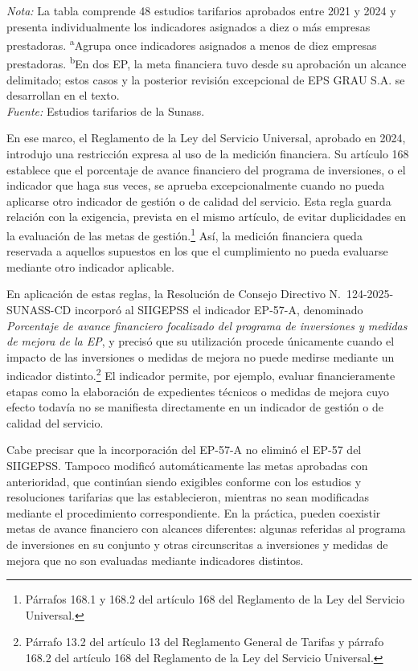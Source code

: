 \begin{table}[!t]
\vspace{0.15cm}
\begin{minipage}{\columnwidth}
\scriptsize
\textit{Nota:} La tabla comprende 48 estudios tarifarios aprobados entre 2021 y 2024 y presenta individualmente los indicadores asignados a diez o más empresas prestadoras. \textsuperscript{a}Agrupa once indicadores asignados a menos de diez empresas prestadoras. \textsuperscript{b}En dos EP, la meta financiera tuvo desde su aprobación un alcance delimitado; estos casos y la posterior revisión excepcional de EPS GRAU S.A. se desarrollan en el texto.\\
\textit{Fuente:} Estudios tarifarios de la Sunass.\\
\end{minipage}
\end{table}

En ese marco, el Reglamento de la Ley del Servicio Universal, aprobado en 2024, introdujo una restricción expresa al uso de la medición financiera. Su artículo 168 establece que el porcentaje de avance financiero del programa de inversiones, o el indicador que haga sus veces, se aprueba excepcionalmente cuando no pueda aplicarse otro indicador de gestión o de calidad del servicio. Esta regla guarda relación con la exigencia, prevista en el mismo artículo, de evitar duplicidades en la evaluación de las metas de gestión.\footnote{Párrafos 168.1 y 168.2 del artículo 168 del Reglamento de la Ley del Servicio Universal.} Así, la medición financiera queda reservada a aquellos supuestos en los que el cumplimiento no pueda evaluarse mediante otro indicador aplicable.

En aplicación de estas reglas, la Resolución de Consejo Directivo N.\textdegree~124-2025-SUNASS-CD incorporó al SIIGEPSS el indicador EP-57-A, denominado \textit{Porcentaje de avance financiero focalizado del programa de inversiones y medidas de mejora de la EP}, y precisó que su utilización procede únicamente cuando el impacto de las inversiones o medidas de mejora no puede medirse mediante un indicador distinto.\footnote{Párrafo 13.2 del artículo 13 del Reglamento General de Tarifas y párrafo 168.2 del artículo 168 del Reglamento de la Ley del Servicio Universal.} El indicador permite, por ejemplo, evaluar financieramente etapas como la elaboración de expedientes técnicos o medidas de mejora cuyo efecto todavía no se manifiesta directamente en un indicador de gestión o de calidad del servicio.

Cabe precisar que la incorporación del EP-57-A no eliminó el EP-57 del SIIGEPSS. Tampoco modificó automáticamente las metas aprobadas con anterioridad, que continúan siendo exigibles conforme con los estudios y resoluciones tarifarias que las establecieron, mientras no sean modificadas mediante el procedimiento correspondiente. En la práctica, pueden coexistir metas de avance financiero con alcances diferentes: algunas referidas al programa de inversiones en su conjunto y otras circunscritas a inversiones y medidas de mejora que no son evaluadas mediante indicadores distintos.

